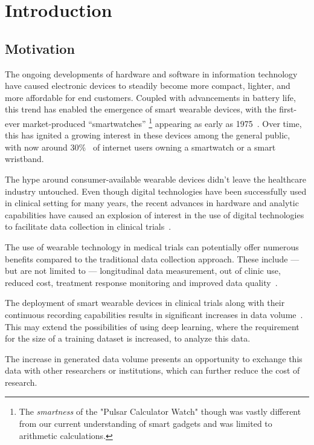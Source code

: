 \chapter{Introduction}\label{ch:introduction}

\section{Motivation}\label{sec:motivation}

The ongoing developments of hardware and software in information technology have caused electronic devices to steadily become more compact, lighter,
and more affordable for end customers.
Coupled with advancements in battery life, this trend has enabled the emergence of smart wearable devices,
with the first-ever market-produced ``smartwatches''
\footnote{The \textit{smartness} of the "Pulsar Calculator Watch" though was vastly different from our current
understanding of smart gadgets and was limited to arithmetic calculations.} appearing as early as 1975~\cite{ometov_survey_2021}.
Over time, this has ignited a growing interest in these devices among the general public, with now around
30\%~\cite{simon_kemp_rise_2023} of internet users owning a smartwatch or a smart wristband.

The hype around consumer-available wearable devices didn't leave the healthcare industry untouched.
Even though digital technologies have been successfully used in clinical setting for many years, the recent advances in
hardware and analytic capabilities have caused an explosion of interest in the use of digital technologies to
facilitate data collection in clinical trials~\cite{clay_impact_2017}.

The use of wearable technology in medical trials can potentially offer numerous benefits compared to the
traditional data collection approach.
These include --- but are not limited to --- longitudinal data measurement, out of clinic use, reduced cost, treatment response monitoring and improved data quality~\cite{munos_mobile_2016}.

The deployment of smart wearable devices in clinical trials along with their continuous recording capabilities results in significant increases in data volume~\cite{munos_mobile_2016}.
This may extend the possibilities of using deep learning, where the requirement for the size of a training dataset is increased, to analyze this data.

The increase in generated data volume presents an opportunity to exchange this data with other researchers or institutions, which can further reduce the cost of research.

